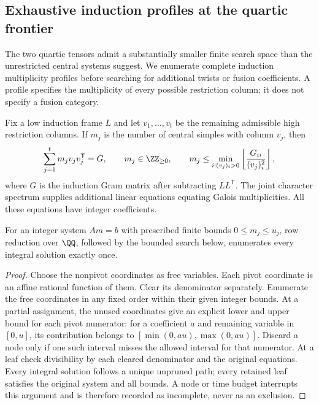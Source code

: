 \subsection{Exhaustive induction profiles at the quartic frontier}
\label{subsec:round4-quartic-profiles}
The two quartic tensors admit a substantially smaller finite
search space than the unrestricted central systems suggest.  We enumerate
complete induction multiplicity profiles before searching for additional
twists or fusion coefficients.  A profile specifies the multiplicity of
every possible restriction column; it does not specify a fusion category.

Fix a low induction frame $L$ and let $v_1,\ldots,v_t$ be the remaining
admissible high restriction columns.  If $m_j$ is the number of central
simples with column $v_j$, then
\[
 \sum_{j=1}^t m_jv_jv_j^{\mathsf T}=G,
 \qquad m_j\in\ZZ_{\geq0},
 \qquad
 m_j\leq \min_{i:(v_j)_i>0}
       \left\lfloor\frac{G_{ii}}{(v_j)_i^2}\right\rfloor,
\]
where $G$ is the induction Gram matrix after subtracting $LL^{\mathsf T}$.
The joint character spectrum supplies additional linear equations equating
Galois multiplicities.  All these equations have integer coefficients.

\begin{proposition}
\label{prop:round4-affine-profile-enumeration}
For an integer system $Am=b$ with prescribed finite bounds
$0\leq m_j\leq u_j$, row reduction over $\QQ$, followed by the bounded
search below, enumerates every integral solution exactly once.
\end{proposition}
\begin{proof}
Choose the nonpivot coordinates as free variables.  Each pivot coordinate
is an affine rational function of them.  Clear its denominator separately.
Enumerate the free coordinates in any fixed order within their given
integer bounds.  At a partial assignment, the unused coordinates give an
explicit lower and upper bound for each pivot numerator: for a coefficient
$a$ and remaining variable in $[0,u]$, its contribution belongs to
$[\min(0,au),\max(0,au)]$.  Discard a node only if one such interval misses
the allowed interval for that numerator.  At a leaf check divisibility by
each cleared denominator and the original equations.  Every integral
solution follows a unique unpruned path; every retained leaf satisfies the
original system and all bounds.  A node or time budget interrupts this
argument and is therefore recorded as incomplete, never as an exclusion.
\end{proof}

